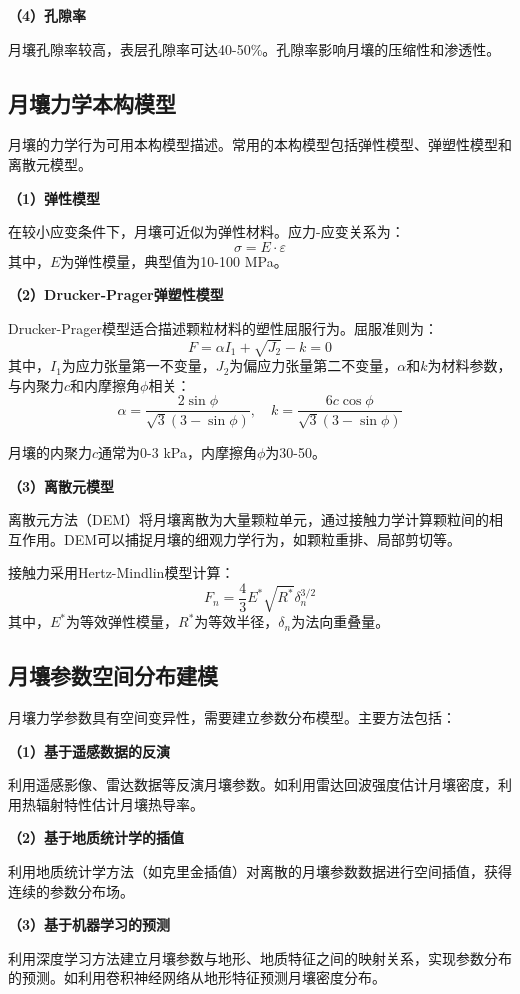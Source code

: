 \textbf{（4）孔隙率}

月壤孔隙率较高，表层孔隙率可达40-50\%。孔隙率影响月壤的压缩性和渗透性。

\subsection{月壤力学本构模型}
\label{subsec:soil_constitutive}

月壤的力学行为可用本构模型描述。常用的本构模型包括弹性模型、弹塑性模型和离散元模型。

\textbf{（1）弹性模型}

在较小应变条件下，月壤可近似为弹性材料。应力-应变关系为：
\begin{equation}
    \sigma = E \cdot \varepsilon
    \label{eq:elastic}
\end{equation}
其中，$E$为弹性模量，典型值为10-100 MPa。

\textbf{（2）Drucker-Prager弹塑性模型}

Drucker-Prager模型适合描述颗粒材料的塑性屈服行为。屈服准则为：
\begin{equation}
    F = \alpha I_1 + \sqrt{J_2} - k = 0
    \label{eq:dp_yield}
\end{equation}
其中，$I_1$为应力张量第一不变量，$J_2$为偏应力张量第二不变量，$\alpha$和$k$为材料参数，与内聚力$c$和内摩擦角$\phi$相关：
\begin{equation}
    \alpha = \frac{2\sin\phi}{\sqrt{3}(3-\sin\phi)}, \quad k = \frac{6c\cos\phi}{\sqrt{3}(3-\sin\phi)}
    \label{eq:dp_params}
\end{equation}

月壤的内聚力$c$通常为0-3 kPa，内摩擦角$\phi$为30-50\degree。

\textbf{（3）离散元模型}

离散元方法（DEM）将月壤离散为大量颗粒单元，通过接触力学计算颗粒间的相互作用。DEM可以捕捉月壤的细观力学行为，如颗粒重排、局部剪切等。

接触力采用Hertz-Mindlin模型计算：
\begin{equation}
    F_n = \frac{4}{3}E^*\sqrt{R^*}\delta_n^{3/2}
    \label{eq:hertz}
\end{equation}
其中，$E^*$为等效弹性模量，$R^*$为等效半径，$\delta_n$为法向重叠量。

\subsection{月壤参数空间分布建模}
\label{subsec:soil_distribution}

月壤力学参数具有空间变异性，需要建立参数分布模型。主要方法包括：

\textbf{（1）基于遥感数据的反演}

利用遥感影像、雷达数据等反演月壤参数。如利用雷达回波强度估计月壤密度，利用热辐射特性估计月壤热导率。

\textbf{（2）基于地质统计学的插值}

利用地质统计学方法（如克里金插值）对离散的月壤参数数据进行空间插值，获得连续的参数分布场。

\textbf{（3）基于机器学习的预测}

利用深度学习方法建立月壤参数与地形、地质特征之间的映射关系，实现参数分布的预测。如利用卷积神经网络从地形特征预测月壤密度分布。
